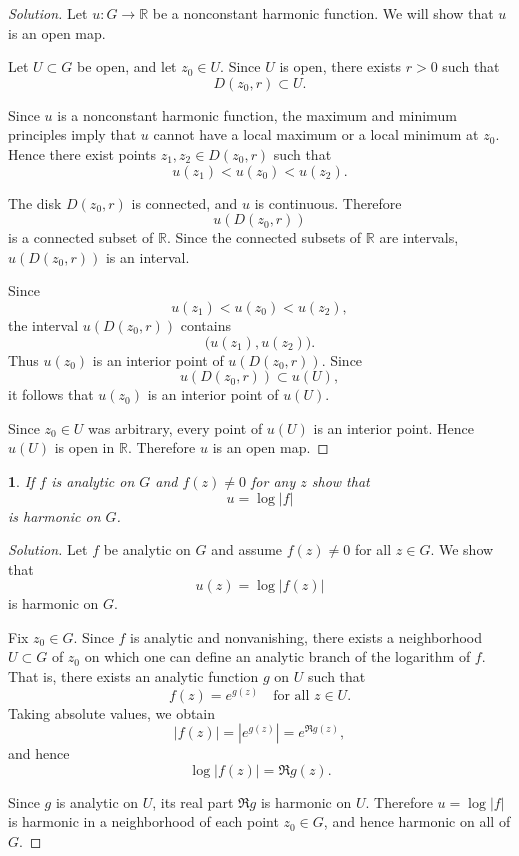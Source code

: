 \documentclass[12pt, a4paper]{report}
\theoremstyle{spaced}
\newtheorem{exercise}{}
\newcommand{\setexercise}[1]{\setcounter{exercise}{#1-1}}
\begin{document}
\begin{proof}[Solution]
	Let \(u:G\to\mathbb{R}\) be a nonconstant harmonic function. We will show that \(u\) is an open map.

	Let \(U\subset G\) be open, and let \(z_0\in U\). Since \(U\) is open, there exists \(r>0\) such that
	\[
		D(z_0,r)\subset U.
	\]

	Since \(u\) is a nonconstant harmonic function, the maximum and minimum principles imply that \(u\) cannot have a local maximum or a local minimum at \(z_0\). Hence there exist points \(z_1,z_2\in D(z_0,r)\) such that
	\[
		u(z_1)<u(z_0)<u(z_2).
	\]

	The disk \(D(z_0,r)\) is connected, and \(u\) is continuous. Therefore
	\[
		u(D(z_0,r))
	\]
	is a connected subset of \(\mathbb{R}\). Since the connected subsets of \(\mathbb{R}\) are intervals, \(u(D(z_0,r))\) is an interval.

	Since
	\[
		u(z_1)<u(z_0)<u(z_2),
	\]
	the interval \(u(D(z_0,r))\) contains
	\[
		\bigl(u(z_1),u(z_2)\bigr).
	\]
	Thus \(u(z_0)\) is an interior point of \(u(D(z_0,r))\). Since
	\[
		u(D(z_0,r))\subset u(U),
	\]
	it follows that \(u(z_0)\) is an interior point of \(u(U)\).

	Since \(z_0\in U\) was arbitrary, every point of \(u(U)\) is an interior point. Hence \(u(U)\) is open in \(\mathbb{R}\). Therefore \(u\) is an open map.
\end{proof}

\setexercise{5}
\begin{exercise}
	If $f$ is analytic on $G$ and $f(z)\ne 0$ for any $z$ show that
	\[
		u=\log |f|
	\]
	is harmonic on $G$.
\end{exercise}
\begin{proof}[Solution]
	Let \(f\) be analytic on \(G\) and assume \(f(z)\neq 0\) for all \(z\in G\). We show that
	\[
		u(z)=\log |f(z)|
	\]
	is harmonic on \(G\).

	Fix \(z_0\in G\). Since \(f\) is analytic and nonvanishing, there exists a neighborhood \(U\subset G\) of \(z_0\) on which one can define an analytic branch of the logarithm of \(f\). That is, there exists an analytic function \(g\) on \(U\) such that
	\[
		f(z)=e^{g(z)} \quad \text{for all } z\in U.
	\]
	Taking absolute values, we obtain
	\[
		|f(z)| = |e^{g(z)}| = e^{\Re g(z)},
	\]
	and hence
	\[
		\log |f(z)| = \Re g(z).
	\]

	Since \(g\) is analytic on \(U\), its real part \(\Re g\) is harmonic on \(U\). Therefore \(u=\log|f|\) is harmonic in a neighborhood of each point \(z_0\in G\), and hence harmonic on all of \(G\).
\end{proof}
\end{document}
